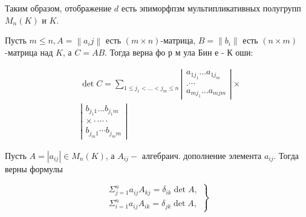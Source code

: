 \documentclass[10pt]{article}
\begin{document}
Таким образом, отображение $d$ есть эпиморфпзм мультипликативных полугрупп $M_{n}(K)$ и $K$.



Пусть $m \leqslant n, A=\left\|a_{i} j\right\|$ есть $(m \times n)$-матрица, $B=\left\|b_{i}\right\|$ есть $(n \times m)$-матрица над $K$, а $C=A B$. Тогда верна фо р м ула Бин е - К оши:



\[

\begin{aligned}

& \operatorname{det} C=\sum_{1 \leqslant j_{1}<\ldots<j_{m} \leqslant n}\left|\begin{array}{c}

a_{1 j_{1}} \ldots a_{1 j_{m}} \\

. \cdots \\

a_{m j_{1}} \ldots a_{m j m}

\end{array}\right| \times \\

& \left|\begin{array}{c}

b_{j_{1} 1} \ldots b_{j_{1} m} \\

\times \cdot \cdots \cdot \\

b_{j_{m} 1} \cdots b_{j_{m} m}

\end{array}\right|

\end{aligned}

\]



Пусть $A=\left|a_{i j}\right| \in M_{n}(K)$, а $A_{i j}-$ алгебраич. дополнение элемента $a_{i j}$. Тогда верны формулы



\[

\left.\begin{array}{c}

\Sigma_{j=1}^{n} a_{i j} A_{k j}=\delta_{i k} \operatorname{det} A, \\

\Sigma_{i=1}^{n} a_{i j} A_{i k}=\delta_{j k} \operatorname{det} A,

\end{array}\right\}

\]
\end{document}
